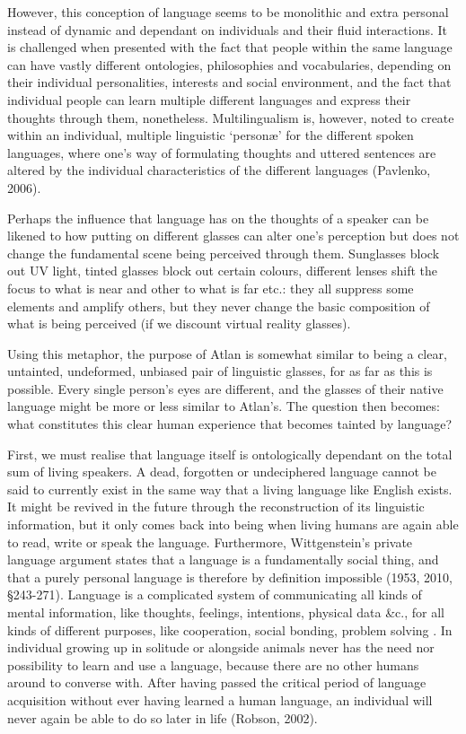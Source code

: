 However, this conception of language seems to be monolithic and extra personal instead of dynamic and dependant on individuals and their fluid interactions. It is challenged when presented with the fact that people within the same language can have vastly different ontologies, philosophies and vocabularies, depending on their individual personalities, interests and social environment, and the fact that individual people can learn multiple different languages and express their thoughts through them, nonetheless. Multilingualism is, however, noted to create within an individual, multiple linguistic ‘personæ’ for the different spoken languages, where one’s way of formulating thoughts and uttered sentences are altered by the individual characteristics of the different languages  (Pavlenko, 2006). 

Perhaps the influence that language has on the thoughts of a speaker can be likened to how putting on different glasses can alter one’s perception but does not change the fundamental scene being perceived through them. Sunglasses block out UV light, tinted glasses block out certain colours, different lenses shift the focus to what is near and other to what is far etc.: they all suppress some elements and amplify others, but they never change the basic composition of what is being perceived (if we discount virtual reality glasses). 

Using this metaphor, the purpose of Atlan is somewhat similar to being a clear, untainted, undeformed, unbiased pair of linguistic glasses, for as far as this is possible. Every single person’s eyes are different, and the glasses of their native language might be more or less similar to Atlan’s. The question then becomes: what constitutes this clear human experience that becomes tainted by language?  

First, we must realise that language itself is ontologically dependant on the total sum of living speakers. A dead, forgotten or undeciphered language cannot be said to currently exist in the same way that a living language like English exists. It might be revived in the future through the reconstruction of its linguistic information, but it only comes back into being when living humans are again able to read, write or speak the language. Furthermore, Wittgenstein’s private language argument states that a language is a fundamentally social thing, and that a purely personal language is therefore by definition impossible (1953, 2010, \S 243-271). Language is a complicated system of communicating all kinds of mental information, like thoughts, feelings, intentions, physical data \&c., for all kinds of different purposes, like cooperation, social bonding, problem solving . In individual growing up in solitude or alongside animals never has the need nor possibility to learn and use a language, because there are no other humans around  to converse with. After having passed the critical period of language acquisition without ever having learned a human language, an individual will never again be able to do so later in life (Robson, 2002).  

